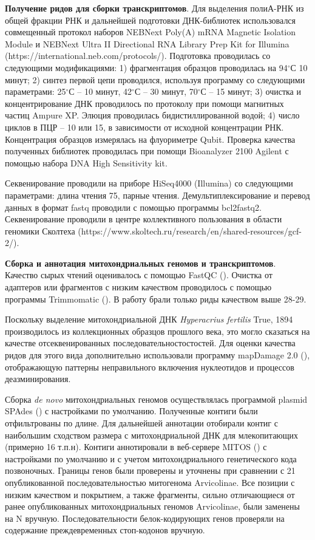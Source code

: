 \textbf{Получение ридов для сборки транскриптомов}. Для выделения полиА-РНК из общей фракции РНК и дальнейшей подготовки ДНК-библиотек использовался совмещенный протокол наборов NEBNext Poly(A) mRNA Magnetic Isolation Module и NEBNext Ultra II Directional RNA Library Prep Kit for Illumina (https://international.neb.com/protocols/). Подготовка проводилась со следующими модификациями: 
1) фрагментация образцов проводилась на 94$^\circ$С 10 минут; 
2) синтез первой цепи проводился, используя программу со следующими параметрами: 25$^\circ$С -- 10 минут, 42$^\circ$С -- 30 минут, 70$^\circ$С -- 15 минут; 
3) очистка и концентрирование ДНК проводилось по протоколу при помощи магнитных частиц Ampure XP. Элюция проводилась бидистиллированной водой; 
4) число циклов в ПЦР -- 10 или 15, в зависимости от исходной концентрации РНК. 
Концентрация образцов измерялась на флуориметре Qubit. Проверка качества полученных библиотек проводилась при помощи Bioanalyzer 2100 Agilent с помощью набора DNA High Sensitivity kit. 

Секвенирование проводили на приборе HiSeq4000 (Illumina) со следующими параметрами: длина чтения 75, парные чтения. Демультиплексирование и перевод данных в формат fastq проводили с помощью программы bcl2fastq2. Секвенирование проводили в центре коллективного пользования в области геномики Сколтеха (https://www.skoltech.ru/research/en/shared-resources/gcf-2/).

\textbf{Сборка и аннотация митохондриальных геномов и транскриптомов}. Качество сырых чтений оценивалось с помощью FastQC (\cite{Andrews2010}). Очистка от адаптеров или фрагментов с низким качеством проводилось с помощью программы Trimmomatic (\cite{Bolger2014}). В работу брали только риды качеством выше 28-29.

Поскольку выделение митохондриальной ДНК \textit{Hyperacrius fertilis} True, 1894 производилось из коллекционных образцов прошлого века, это могло сказаться на качестве отсеквенированных последовательностостостей. Для оценки качества ридов для этого вида дополнительно использовали программу mapDamage 2.0 (\cite{Jonsson2013}), отображающую паттерны неправильного включения нуклеотидов и процессов деазминирования. 

Сборка \textit{de novo} митохондриальных геномов осуществлялась программой plasmid SPAdes (\cite{Bankevich2012}) с настройками по умолчанию. Полученные контиги были отфильтрованы по длине. Для дальнейшей аннотации отобирали контиг с наибольшим сходством размера с митохондриальной ДНК для млекопитающих (примерно 16 т.п.н). Контиги аннотировали в веб-сервере MITOS (\cite{Bernt2013}) с настройками по умолчанию и с учетом митохондриального генетического кода позвоночных. Границы генов были проверены и уточнены при сравнении с 21 опубликованной последовательностью митогенома Arvicolinae. Все позиции с низким качеством и покрытием, а также фрагменты, сильно отличающиеся от ранее опубликованных митохондриальных геномов Arvicolinae, были заменены на N вручную. Последовательности белок-кодирующих генов проверяли на содержание преждевременных стоп-кодонов вручную.

